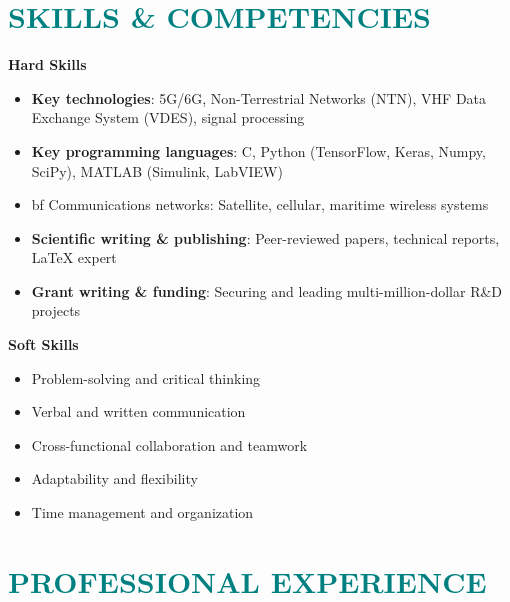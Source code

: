 \documentclass[a4paper, 11pt]{article}
\begin{document}
	
\section{\textcolor{teal}{\bf{SKILLS \& COMPETENCIES}}}

	\vspace{3pt}
	
	{\bf Hard Skills}
	\begin{itemize}[leftmargin=*, itemsep=-1mm]
		
		\item {\bf Key technologies}: 5G/6G, Non-Terrestrial Networks (NTN), VHF Data Exchange System (VDES), signal processing
		
		\item {\bf Key programming languages}: C, Python (TensorFlow, Keras, Numpy, SciPy), MATLAB (Simulink, LabVIEW)
		
		\item {bf Communications networks}: Satellite, cellular, maritime wireless systems
		
		\item {\bf Scientific writing \& publishing}: Peer-reviewed papers, technical reports, LaTeX expert
		
		\item {\bf Grant writing \& funding}: Securing and leading multi-million-dollar R\&D projects
		
	\end{itemize}	
	{\bf Soft Skills}
	
	\begin{itemize}[leftmargin=*, itemsep=-1mm]
		
		\item Problem-solving and critical thinking
		
		\item Verbal and written communication
		
		\item Cross-functional collaboration and teamwork
		
		\item Adaptability and flexibility
		
		\item Time management and organization
		
	\end{itemize}
	

\section{\textcolor{teal}{\bf{PROFESSIONAL EXPERIENCE}}}
\end{document}
